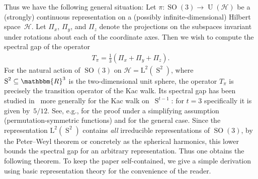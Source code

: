 \documentclass[11pt,a4paper]{article}
\numberwithin{equation}{section}
\newcommand{\RR}{\mathbbm{R}}
\newcommand{\HH}{\mathcal{H}}
\newcommand{\1}{\mathbf{1}}
\renewcommand{\S}{\operatorname{S}}
\DeclareMathOperator{\SO}{SO}
\DeclareMathOperator{\U}{U}
\begin{document}
Thus we have the following general situation:
Let $\pi \colon \SO(3) \to \U(\HH)$ be a (strongly) continuous representation on a (possibly infinite-dimensional) Hilbert space~$\HH$.
Let $\Pi_x$, $\Pi_y$, and $\Pi_z$ denote the projections on the subspaces invariant under rotations about each of the coordinate axes.
Then we wish to compute the spectral gap of the operator
\begin{align}\label{eq:def-T}
    T_\pi = \frac13 \left( \Pi_x + \Pi_y + \Pi_z \right).
\end{align}
For the natural action of $\SO(3)$ on $\HH = \mathrm{L}^2(\S^2)$, where $\S^2 \subseteq \RR^3$ is the two-dimensional unit sphere, the operator $T_\pi$ is precisely the transition operator of the Kac walk.
Its spectral gap has been studied in~\cite{carlen2000many,diaconis2000bounds,carlen2003determination,maslen2003eigenvalues,caputo2008spectral} more generally for the Kac walk on~$\S^{t-1}$: for $t=3$ specifically it is given by~$5/12$.
See, e.g., \cite[Thm.~3.1, $N=3$]{carlen2000many} for the proof under a simplifying assumption (permutation-symmetric functions) and \cite[Thm.~1.3, $N=3$ and $\rho=1/(2\pi)$]{carlen2003determination} for the general case.
Since the representation $\mathrm{L}^2(\S^2)$ contains \emph{all} irreducible representations of $\SO(3)$, by the Peter--Weyl theorem or concretely as the spherical harmonics, this lower bounds the spectral gap for an arbitrary representation.
Thus one obtains the following theorem.
To keep the paper self-contained, we give a simple derivation using basic representation theory for the convenience of the reader.
\end{document}

